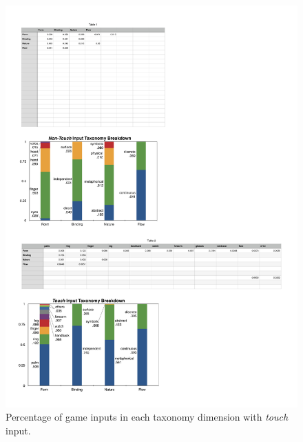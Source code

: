 \documentclass{sigchi}
\begin{document}
 \begin{figure}[!h]
  \centering
  \includegraphics[width=1\columnwidth]{OnbodyTaxonomy.pdf}
  \caption{Percentage of game inputs in each taxonomy dimension with \emph{touch} input.}
  \label{fig:OnbodyTaxonomy}
  \end{figure} 
\end{document}
